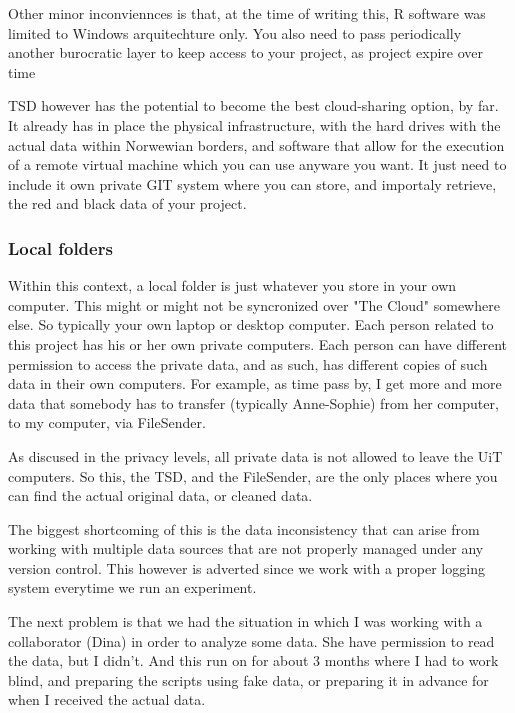 Other minor inconviennces is that, at the time of writing this, R software was limited to Windows arquitechture only. You also need to pass periodically another burocratic layer to keep access to your project, as project expire over time\vspace{3 mm}

TSD however has the potential to become the best cloud-sharing option, by far. It already has in place the physical infrastructure, with the hard drives with the actual data within Norwewian borders, and software that allow for the execution of a remote virtual machine which you can use anyware you want. It just need to include it own private GIT system where you can store, and importaly retrieve, the red and black data of your project. \vspace{3 mm}

\subsubsection{Local folders}

Within this context, a local folder is just whatever you store in your own computer. This might or might not be syncronized over "The Cloud" somewhere else. So typically your own laptop or desktop computer. Each person related to this project has his or her own private computers. Each person can have different permission to access the private data, and as such, has different copies of such data in their own computers. For example, as time pass by, I get more and more data that somebody has to transfer (typically Anne-Sophie) from her computer, to my computer, via FileSender.\vspace{3 mm}

As discused in the privacy levels, all private data is not allowed to leave the UiT computers. So this, the TSD, and the FileSender, are the only places where you can find the actual original data, or cleaned data.\vspace{3 mm}

The biggest shortcoming of this is the data inconsistency that can arise from working with multiple data sources that are not properly managed under any version control. This however is adverted since we work with a proper logging system everytime we run an experiment.\vspace{3 mm}

The next problem is that we had the situation in which I was working with a collaborator (Dina) in order to analyze some data. She have permission to read the data, but I didn't. And this run on for about 3 months where I had to work blind, and preparing the scripts using fake data, or preparing it in advance for when I received the actual data. \vspace{3 mm}

